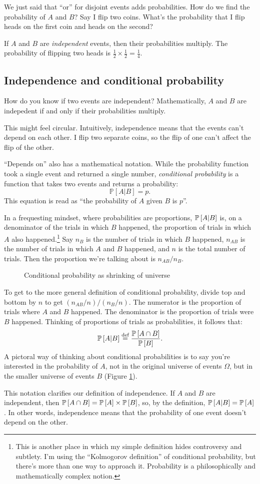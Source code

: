We just said that ``or'' for disjoint events adds probabilities. How do we
find the probability of $A$ and $B$? Say I flip two coins. What's the
probability that I flip heads on the first coin and heads on the second?

If $A$ and $B$ are \emph{independent} events, then their probabilities
multiply. The probability of flipping two heads is $\tfrac{1}{2} \times
\tfrac{1}{2} = \tfrac{1}{4}$.

\subsection{Independence and conditional probability}

How do you know if two events are independent? Mathematically, $A$ and $B$
are indepedent if and only if their probabilities multiply.

This might feel circular. Intuitively, independence means that the events
can't depend on each other. I flip two separate coins, so the flip of one
can't affect the flip of the other.

``Depends on'' also has a mathematical notation. While the probability function
took a single event and returned a single number, \emph{conditional
probability} is a function that takes two events and returns a probability:
$$
\mathbb{P}[A | B] = p.
$$
This equation is read as ``the probability of $A$ given $B$ is $p$''.

In a frequesting mindset, where probabilities are proportions, $\mathbb{P}\left[{A | B}\right]$
is, on a denominator of the trials in which $B$ happened, the proportion of
trials  in which $A$ also happened.\footnote{This is another place in which my
simple definition hides controversy and subtlety. I'm using the ``Kolmogorov
definition'' of conditional probability, but there's more than one way to
approach it. Probability is a philosophically and mathematically complex notion.}
Say $n_B$ is the number of trials in which $B$ happened, $n_{AB}$ is the
number of trials in which $A$ and $B$ happened, and $n$ is the total number of
trials. Then the proportion we're talking about is $n_{AB} / n_B$.

\begin{figure}
\caption{Conditional probability as shrinking of universe}
\label{fig:conditional-probability}
\end{figure}

To get to the more general definition of conditional probability, divide top
and bottom by $n$ to get $(n_{AB}/n) / (n_B/n)$. The numerator is the
proportion of trials where $A$ and $B$ happened. The denominator is the
proportion of trials were $B$ happened. Thinking of proportions of trials as
probabilities, it follows that: $$ \mathbb{P}\left[{A | B}\right] \stackrel{\text{def}}{=} \frac{\mathbb{P}\left[{A \cap
B}\right]}{\mathbb{P}\left[{B}\right]}. $$ A pictoral way of thinking about conditional probabilities
is to say you're interested in the probability of $A$, not in the original
universe of events $\Omega$, but in the smaller universe of events $B$ (Figure
\ref{fig:conditional-probability}).

This notation clarifies our definition of independence. If $A$ and $B$ are
independent, then $\mathbb{P}\left[{A \cap B}\right] = \mathbb{P}\left[{A}\right] \times \mathbb{P}\left[{B}\right]$, so, by the
definition, $\mathbb{P}\left[{A | B}\right] = \mathbb{P}\left[{A}\right]$. In other words, independence means that
the probability of one event doesn't depend on the other.